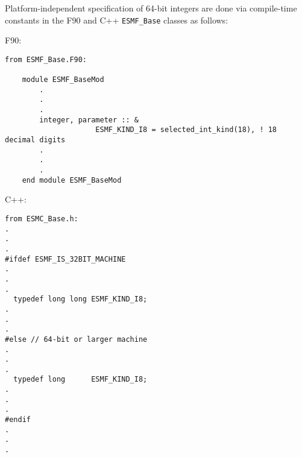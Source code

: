 
Platform-independent specification of 64-bit integers are done via
compile-time constants in the F90 and C++ {\tt ESMF\_Base} classes as follows:

F90:
\begin{verbatim}
from ESMF_Base.F90:

    module ESMF_BaseMod
        .
        .
        .
        integer, parameter :: &
                     ESMF_KIND_I8 = selected_int_kind(18), ! 18 decimal digits
        .
        .
        .
    end module ESMF_BaseMod
\end{verbatim}

C++:
\begin{verbatim}
from ESMC_Base.h:
.
.
.
#ifdef ESMF_IS_32BIT_MACHINE
.
.
.
  typedef long long ESMF_KIND_I8;
.
.
.
#else // 64-bit or larger machine
.
.
.
  typedef long      ESMF_KIND_I8;
.
.
.
#endif
.
.
.
\end{verbatim}

